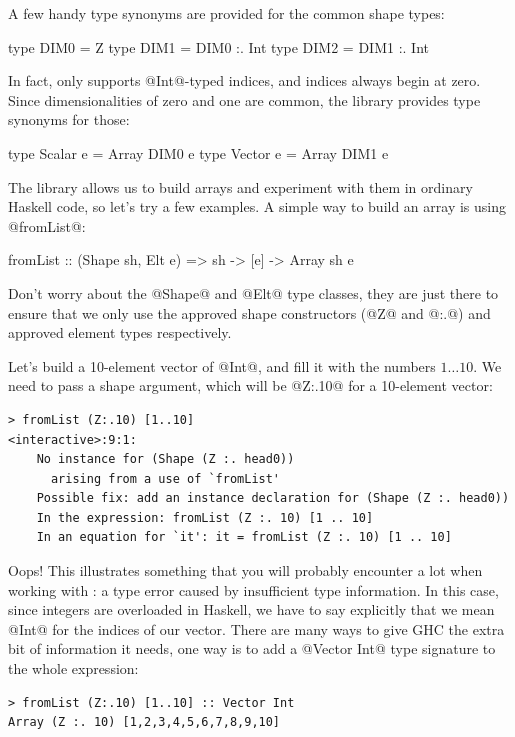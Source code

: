 A few handy type synonyms are provided for the common shape types:

\begin{haskell}
type DIM0 = Z
type DIM1 = DIM0 :. Int
type DIM2 = DIM1 :. Int
\end{haskell}

\noindent In fact, \acc{} only supports @Int@-typed indices, and indices
always begin at zero.  Since dimensionalities of zero and one are
common, the library provides type synonyms for those:

\begin{haskell}
type Scalar e = Array DIM0 e
type Vector e = Array DIM1 e
\end{haskell}

The library allows us to build arrays and experiment with them in
ordinary Haskell code, so let's try a few examples.  A simple way to
build an array is using @fromList@:

\begin{haskell}
fromList :: (Shape sh, Elt e) => sh -> [e] -> Array sh e
\end{haskell}

\noindent Don't worry about the @Shape@ and @Elt@ type classes, they
are just there to ensure that we only use the approved shape
constructors (@Z@ and @:.@) and approved element types respectively.

Let's build a 10-element vector of @Int@, and fill it with the numbers
$1\ldots10$.  We need to pass a shape argument, which will be @Z:.10@
for a 10-element vector:

\begin{verbatim}
> fromList (Z:.10) [1..10]
<interactive>:9:1:
    No instance for (Shape (Z :. head0))
      arising from a use of `fromList'
    Possible fix: add an instance declaration for (Shape (Z :. head0))
    In the expression: fromList (Z :. 10) [1 .. 10]
    In an equation for `it': it = fromList (Z :. 10) [1 .. 10]
\end{verbatim}

\noindent Oops!  This illustrates something that you will probably
 encounter a lot when working with \acc: a type error caused by
insufficient type information.  In this case, since integers are
overloaded in Haskell, we have to say explicitly that we mean @Int@
for the indices of our vector.  There are many ways to give GHC the
extra bit of information it needs, one way is to add a @Vector Int@
type signature to the whole expression:

\begin{verbatim}
> fromList (Z:.10) [1..10] :: Vector Int
Array (Z :. 10) [1,2,3,4,5,6,7,8,9,10]
\end{verbatim}

